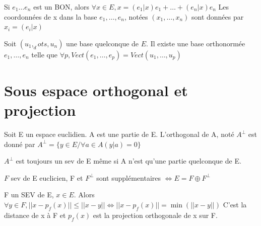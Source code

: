 \documentclass[french]{yLectureNote}
\begin{document}
\begin{proposition}
Si $e_1\dots e_n$ est un BON, alors $\forall x\in E, x= (e_1|x)e_1+\dots + (e_n|x)e_n$
    Les coordonnées de x dans la base $e_1,\dots, e_n$, notées $(x_1,\dots, x_n)$ sont données par $x_i = (e_i|x)$

\end{proposition}

\begin{proposition}
Soit $(u_1, _dots, u_n)$ une base quelconque de $E$. Il existe une base orthonormée $e_1,\dots, e_n$
    telle que $\forall p, Vect(e_1,\dots, e_p) = Vect(u_1,\dots, u_p)$

\end{proposition}

\section{Sous espace orthogonal et projection}

\begin{definition}
Soit E un espace euclidien. A est une partie de E. L'orthogonal de A, noté 
    $A^{\perp}$ est donné par $A^{\perp} = \{y\in E/ \forall a \in A (y|a)=0\}$

\end{definition}

\begin{proposition}
$A^{\perp}$ est toujours un sev de E m\^eme si A n'est qu'une partie quelconque de E.

\end{proposition}

\begin{proposition}
$F$ sev de E euclicien, F et $F^{\perp}$ sont supplémentaires $\iff E = F\oplus F^{\perp}$

\end{proposition}


\begin{proposition}
F un SEV de E, $x\in E$. Alors $\forall y \in F, ||x-p_f(x)||\leq||x-y|| \iff ||x-p_f(x)|| = \min(||x-y||)$
    C'est la distance de x à F et $p_f(x)$ est la projection orthogonale de x sur F.

\end{proposition}
\end{document}
